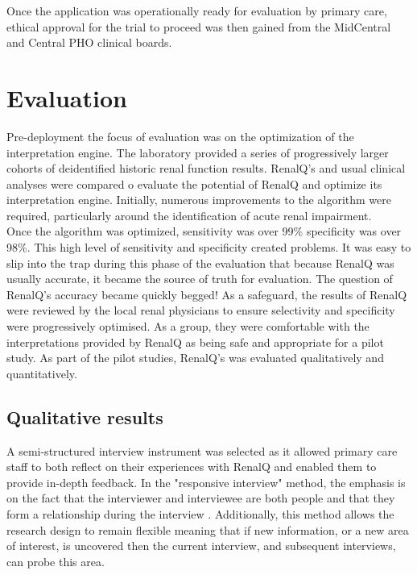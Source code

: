 ﻿\documentclass[11pt]{article}
\begin{document}
Once the application was operationally ready for evaluation by primary care, ethical approval for the trial to proceed was then gained from the MidCentral and Central PHO clinical boards. \\

\section{Evaluation}
Pre-deployment the focus of evaluation was on the optimization of the interpretation engine. The laboratory provided a series of progressively larger cohorts of deidentified historic renal function results. RenalQ's and usual clinical analyses were compared o evaluate the potential of RenalQ and optimize its interpretation engine.  Initially, numerous improvements to the algorithm were required, particularly around the identification of acute renal impairment. \\

Once the algorithm was optimized, sensitivity was over 99\% specificity was over 98\%. This high level of sensitivity and specificity created problems. It was easy to slip into the trap during this phase of the evaluation that because RenalQ was usually accurate, it became the source of truth for evaluation. The question of RenalQ's accuracy became quickly begged! As a safeguard, the results of RenalQ were reviewed by the local renal physicians to ensure selectivity and specificity were progressively optimised. As a group, they were comfortable with the interpretations provided by RenalQ as being safe and appropriate for a pilot study. As part of the pilot studies, RenalQ's was evaluated qualitatively and quantitatively. \\

\subsection{Qualitative results}
A semi-structured interview instrument was selected as it allowed primary care staff to both reflect on their experiences with RenalQ and enabled them to provide in-depth feedback. In the "responsive interview" method, the emphasis is on the fact that the interviewer and interviewee are both people and that they form a relationship during the interview \citep{rubin2011qualitative}. Additionally, this method allows the research design to remain flexible meaning that if new information, or a new area of interest, is uncovered then the current interview, and subsequent interviews, can probe this area. \\
\end{document}
